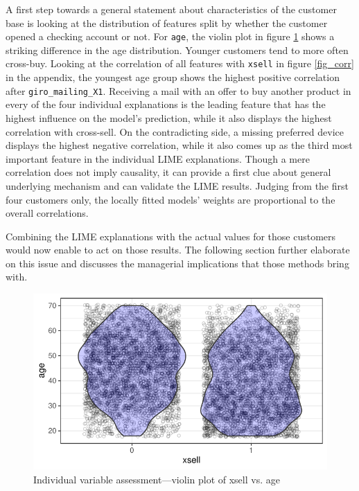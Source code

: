 \documentclass[12pt,a4paper]{article}
\let\code=\texttt
\begin{document}
A first step towards a general statement about characteristics of the customer base is looking at the distribution of features split by whether the customer
opened a checking account or not.
For \code{age}, the violin plot in figure \ref{fig_violin_age} shows a striking difference in the age distribution.
Younger customers tend to more often cross-buy.
Looking at the correlation of all features with \code{xsell} in figure \ref{fig_corr} in the appendix, the youngest age group shows the highest positive correlation after \code{giro\_mailing\_X1}.
Receiving a mail with an offer to buy another product in every of the four individual explanations is the leading feature that has the highest influence on
the model's prediction, while it also displays the highest correlation with cross-sell.
On the contradicting side, a missing preferred device displays the highest negative correlation,
while it also comes up as the third most important feature in the individual LIME explanations.
Though a mere correlation does not imply causality, it can provide a first clue about general underlying mechanism and can validate the LIME results.
Judging from the first four customers only, the locally fitted models' weights are proportional to the overall correlations.

Combining the LIME explanations with the actual values for those customers would now enable to act on those results.
The following section further elaborate on this issue and discusses the managerial implications that those methods bring with.

\begin{figure}[ht]
	\centering
  \includegraphics[scale=0.83]{figures/violin_age_xsell.pdf}
	\caption{Individual variable assessment---violin plot of xsell vs. age}
	\label{fig_violin_age}
\end{figure}
\end{document}
